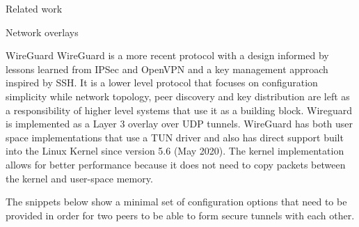 \begin{frame}[fragile]{Related work}
\begin{block}{Network overlays}
\begin{block}{WireGuard}
\protect\hypertarget{thesis__020-related-work.md__wireguard}{}
WireGuard \autocite{donenfeldWireGuardNextGeneration2017} is a more
recent protocol with a design informed by lessons learned from IPSec and
OpenVPN and a key management approach inspired by SSH. It is a lower
level protocol that focuses on configuration simplicity while network
topology, peer discovery and key distribution are left as a
responsibility of higher level systems that use it as a building block.
Wireguard is implemented as a Layer 3 overlay over UDP tunnels.
WireGuard has both user space implementations that use a TUN driver and
also has direct support built into the Linux Kernel since version 5.6
(May 2020). The kernel implementation allows for better performance
because it does not need to copy packets between the kernel and
user-space memory.

The snippets below show a minimal set of configuration options that need
to be provided in order for two peers to be able to form secure tunnels
with each other.

\begin{Shaded}
\begin{Highlighting}[]
\KeywordTok{[Interface]}
\OtherTok{=}
\OtherTok{=}\StringTok{ }
\OtherTok{=}

\KeywordTok{[Peer]}
\OtherTok{=}
\OtherTok{=}
\OtherTok{=}
\end{Highlighting}
\end{Shaded}

\begin{Shaded}
\begin{Highlighting}[]
\KeywordTok{[Interface]}
\OtherTok{=}
\OtherTok{=}\StringTok{ }
\OtherTok{=}

\KeywordTok{[Peer]}
\OtherTok{=}
\OtherTok{=}
\end{Highlighting}
\end{Shaded}


\end{block}
\end{block}
\end{frame}
